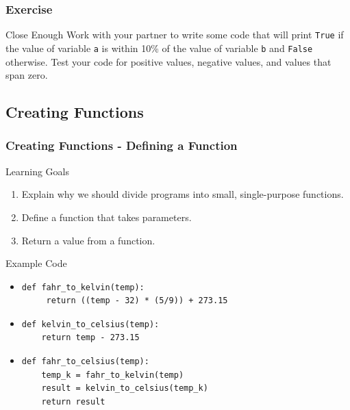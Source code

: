 \documentclass{beamer}
\begin{document}
\begin{frame}
  \frametitle{Exercise}
  \begin{block}{Close Enough}
    Work with your partner to write some code that will print \texttt{True}
    if the value of variable \texttt{a} is within 10\% of the value of variable \texttt{b}
    and \texttt{False} otherwise.
    Test your code for positive values, negative values, and values that span zero.
  \end{block}
\end{frame}




\subsection*{Creating Functions}

\begin{frame}[fragile]
\frametitle{Creating Functions - Defining a Function}
\begin{block}{Learning Goals}
\begin{enumerate}
\item Explain why we should divide programs into small, single-purpose functions.
\item Define a function that takes parameters.
\item Return a value from a function.
\end{enumerate}
\end{block}

\begin{block}{Example Code}
\begin{itemize}
\item
\begin{verbatim}
def fahr_to_kelvin(temp):
     return ((temp - 32) * (5/9)) + 273.15
\end{verbatim}
\item
\begin{verbatim}
def kelvin_to_celsius(temp):
    return temp - 273.15
\end{verbatim}

\item
\begin{verbatim}
def fahr_to_celsius(temp):
    temp_k = fahr_to_kelvin(temp)
    result = kelvin_to_celsius(temp_k)
    return result
\end{verbatim}
\end{itemize}
\end{block}
\end{frame}
\end{document}
